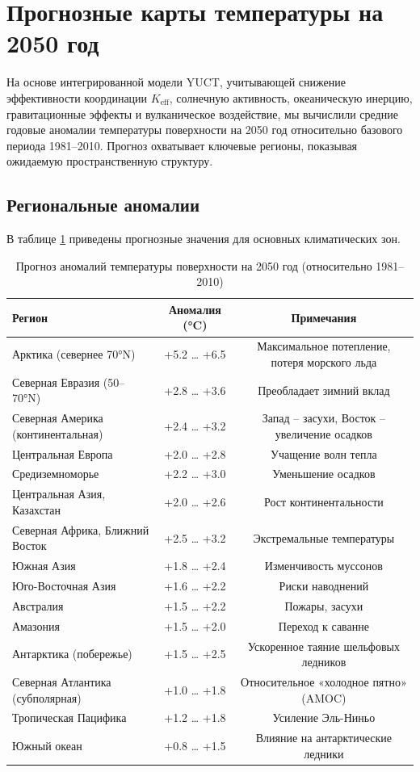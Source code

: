 \documentclass[12pt,a4paper]{article}
\begin{document}
	\section{Прогнозные карты температуры на 2050 год}
	\label{sec:forecast_maps}
	
	На основе интегрированной модели YUCT, учитывающей снижение эффективности координации \(K_{\mathrm{eff}}\), солнечную активность, океаническую инерцию, гравитационные эффекты и вулканическое воздействие, мы вычислили средние годовые аномалии температуры поверхности на 2050 год относительно базового периода 1981–2010. Прогноз охватывает ключевые регионы, показывая ожидаемую пространственную структуру.
	
	\subsection{Региональные аномалии}
	
	В таблице \ref{tab:anomalies_2050} приведены прогнозные значения для основных климатических зон.
	
	\begin{table}[htbp]
		\centering
		\caption{Прогноз аномалий температуры поверхности на 2050 год (относительно 1981–2010)}
		\label{tab:anomalies_2050}
		\small
		\begin{tabular}{p{4.5cm} c c}
			\toprule
			Регион & Аномалия (°C) & Примечания \\
			\midrule
			Арктика (севернее 70°N) & +5.2 … +6.5 & Максимальное потепление, потеря морского льда \\
			Северная Евразия (50–70°N) & +2.8 … +3.6 & Преобладает зимний вклад \\
			Северная Америка (континентальная) & +2.4 … +3.2 & Запад – засухи, Восток – увеличение осадков \\
			Центральная Европа & +2.0 … +2.8 & Учащение волн тепла \\
			Средиземноморье & +2.2 … +3.0 & Уменьшение осадков \\
			Центральная Азия, Казахстан & +2.0 … +2.6 & Рост континентальности \\
			Северная Африка, Ближний Восток & +2.5 … +3.2 & Экстремальные температуры \\
			Южная Азия & +1.8 … +2.4 & Изменчивость муссонов \\
			Юго-Восточная Азия & +1.6 … +2.2 & Риски наводнений \\
			Австралия & +1.5 … +2.2 & Пожары, засухи \\
			Амазония & +1.5 … +2.0 & Переход к саванне \\
			Антарктика (побережье) & +1.5 … +2.5 & Ускоренное таяние шельфовых ледников \\
			Северная Атлантика (субполярная) & +1.0 … +1.8 & Относительное «холодное пятно» (AMOC) \\
			Тропическая Пацифика & +1.2 … +1.8 & Усиление Эль-Ниньо \\
			Южный океан & +0.8 … +1.5 & Влияние на антарктические ледники \\
			\bottomrule
		\end{tabular}
	\end{table}
	
\end{document}
